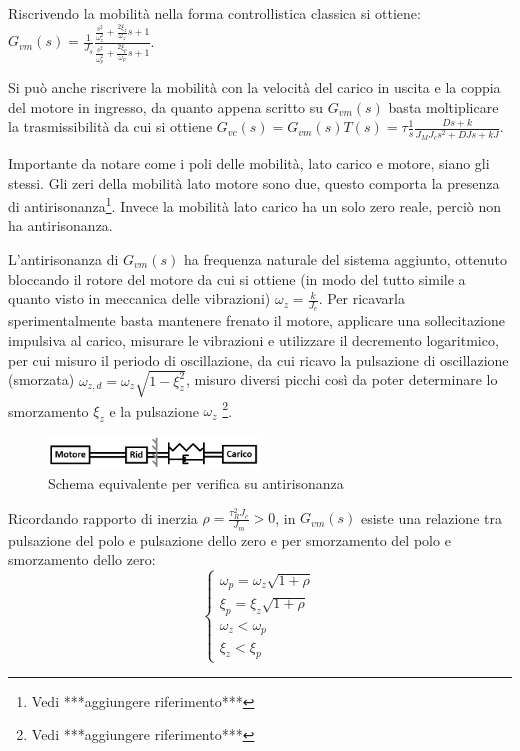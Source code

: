 Riscrivendo la mobilità nella forma controllistica classica si ottiene:
\(G_{vm}(s) = \frac{1}{J_s} \frac{\frac{s^2}{\omega_z^2} + \frac{2\xi_z}{\omega_z} s + 1}{\frac{s^2}{\omega_p^2} + \frac{2\xi_p}{\omega_p} s + 1}\).

Si può anche riscrivere la mobilità con la velocità del carico in uscita e la coppia del motore in ingresso, da quanto appena scritto su \(G_{vm}(s)\) basta moltiplicare la trasmissibilità da cui si ottiene \(G_{vc}(s) = G_{vm}(s) T(s) = \tau \frac{1}{s} \frac{D s + k}{J_M J_c s^2 + D J s + k J}\).

Importante da notare come i poli delle mobilità, lato carico e motore, siano gli stessi.
Gli zeri della mobilità lato motore sono due, questo comporta la presenza di antirisonanza\footnote{Vedi ***aggiungere riferimento***}. Invece la mobilità lato carico ha un solo zero reale, perciò non ha antirisonanza.

L'antirisonanza di \(G_{vm}(s)\) ha frequenza naturale del sistema aggiunto, ottenuto bloccando il rotore del motore da cui si ottiene (in modo del tutto simile a quanto visto in meccanica delle vibrazioni) \(\omega_z=\frac{k}{J_c}\).
Per ricavarla sperimentalmente basta mantenere frenato il motore, applicare una sollecitazione impulsiva al carico, misurare le vibrazioni e utilizzare il decremento logaritmico, per cui misuro il periodo di oscillazione, da cui ricavo la pulsazione di oscillazione (smorzata) \(\omega_{z,d} = \omega_z \sqrt{1-\xi_z^2}\), misuro diversi picchi così da poter determinare lo smorzamento \(\xi_z\) e la pulsazione \(\omega_z\) \footnote{Vedi ***aggiungere riferimento***}.

\begin{figure}[h]
    \centering
    \includegraphics[width=0.5\textwidth]{Immagini/schema_antirisonanza.png}
    \caption{Schema equivalente per verifica su antirisonanza}
\end{figure}

Ricordando rapporto di inerzia \(\rho = \frac{\tau_R^2 J_c}{J_m} > 0\), in \(G_{vm}(s)\) esiste una relazione tra pulsazione del polo e pulsazione dello zero e per smorzamento del polo e smorzamento dello zero:
\[
\begin{cases}
    \omega_p = \omega_z \sqrt{1+\rho} \\
    \xi_p = \xi_z \sqrt{1+\rho} \\
    \omega_z < \omega_p \\
    \xi_z < \xi_p
\end{cases}
\]


